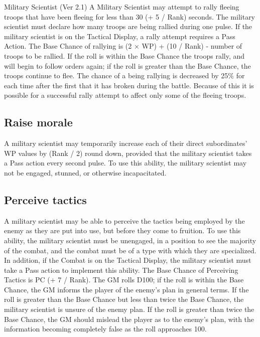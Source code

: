 \begin{Chapter}{Military Scientist (Ver 2.1)}
A Military Scientist may attempt to rally fleeing troops that have
been fleeing for less than 30 (+ 5 / Rank) seconds.  The military
scientist must declare how many troops are being rallied during one
pulse.  If the military scientist is on the Tactical Display, a rally
attempt requires a Pass Action. The Base Chance of rallying is (2 ×
WP) + (10 / Rank) - number of troops to be rallied. If the roll is
within the Base Chance the troops rally, and will begin to follow
orders again; if the roll is greater than the Base Chance, the troops
continue to flee.  The chance of a being rallying is decreased by 25\%
for each time after the first that it has broken during the battle.
Because of this it is possible for a successful rally attempt to
affect only some of the fleeing troops.


\subsection{Raise morale}

A military scientist may temporarily increase each of their direct
subordinates’ WP values by (Rank / 2) round down, provided that the
military scientist takes a Pass action every second pulse. To use this
ability, the military scientist may not be engaged, stunned, or
otherwise incapacitated.

\subsection{Perceive tactics}

A military scientist may be able to perceive the tactics being
employed by the enemy as they are put into use, but before they come
to fruition.  To use this ability, the military scientist must be
unengaged, in a position to see the majority of the combat, and the
combat must be of a type with which they are specialized.  In
addition, if the Combat is on the Tactical Display, the military
scientist must take a Pass action to implement this ability.  The Base
Chance of Perceiving Tactics is PC (+ 7 / Rank). The GM rolls D100; if
the roll is within the Base Chance, the GM informs the player of the
enemy’s plan in general terms. If the roll is greater than the Base
Chance but less than twice the Base Chance, the military scientist is
unsure of the enemy plan. If the roll is greater than twice the Base
Chance, the GM should mislead the player as to the enemy’s plan, with
the information becoming completely false as the roll approaches 100.


\end{Chapter}
